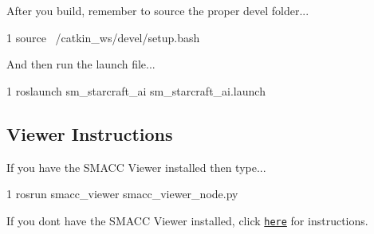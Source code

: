 After you build, remember to source the proper devel folder...


\begin{DoxyCode}
1 source ~/catkin\_ws/devel/setup.bash
\end{DoxyCode}


And then run the launch file...


\begin{DoxyCode}
1 roslaunch sm\_starcraft\_ai sm\_starcraft\_ai.launch
\end{DoxyCode}


\subsection*{Viewer Instructions}

If you have the S\+M\+A\+CC Viewer installed then type...


\begin{DoxyCode}
1 rosrun smacc\_viewer smacc\_viewer\_node.py
\end{DoxyCode}


If you don\textquotesingle{}t have the S\+M\+A\+CC Viewer installed, click \href{http://smacc.ninja/smacc-viewer/}{\tt here} for instructions. 